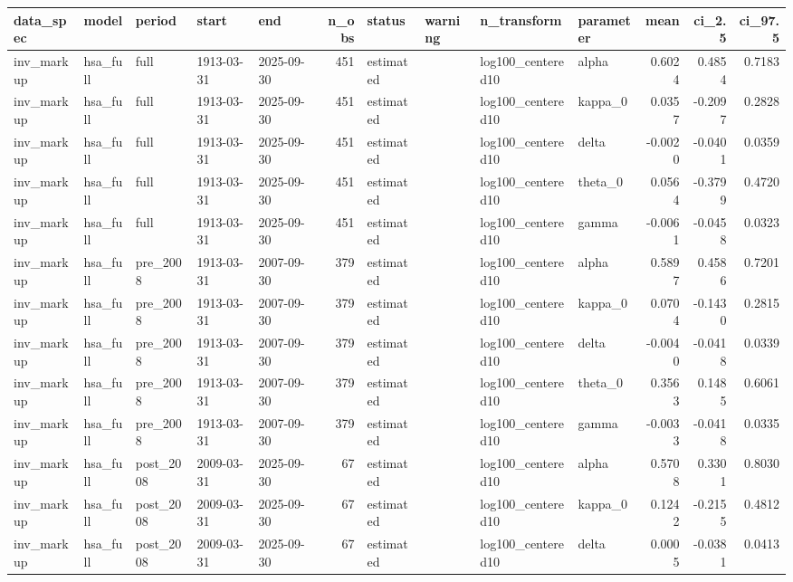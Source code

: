 \begin{tabular}{lllllrllllrrr}
\toprule
data\_spec & model & period & start & end & n\_obs & status & warning & n\_transform & parameter & mean & ci\_2.5 & ci\_97.5 \\
\midrule
inv\_markup & hsa\_full & full & 1913-03-31 & 2025-09-30 & 451 & estimated &  & log100\_centered10 & alpha & 0.6024 & 0.4854 & 0.7183 \\
inv\_markup & hsa\_full & full & 1913-03-31 & 2025-09-30 & 451 & estimated &  & log100\_centered10 & kappa\_0 & 0.0357 & -0.2097 & 0.2828 \\
inv\_markup & hsa\_full & full & 1913-03-31 & 2025-09-30 & 451 & estimated &  & log100\_centered10 & delta & -0.0020 & -0.0401 & 0.0359 \\
inv\_markup & hsa\_full & full & 1913-03-31 & 2025-09-30 & 451 & estimated &  & log100\_centered10 & theta\_0 & 0.0564 & -0.3799 & 0.4720 \\
inv\_markup & hsa\_full & full & 1913-03-31 & 2025-09-30 & 451 & estimated &  & log100\_centered10 & gamma & -0.0061 & -0.0458 & 0.0323 \\
inv\_markup & hsa\_full & pre\_2008 & 1913-03-31 & 2007-09-30 & 379 & estimated &  & log100\_centered10 & alpha & 0.5897 & 0.4586 & 0.7201 \\
inv\_markup & hsa\_full & pre\_2008 & 1913-03-31 & 2007-09-30 & 379 & estimated &  & log100\_centered10 & kappa\_0 & 0.0704 & -0.1430 & 0.2815 \\
inv\_markup & hsa\_full & pre\_2008 & 1913-03-31 & 2007-09-30 & 379 & estimated &  & log100\_centered10 & delta & -0.0040 & -0.0418 & 0.0339 \\
inv\_markup & hsa\_full & pre\_2008 & 1913-03-31 & 2007-09-30 & 379 & estimated &  & log100\_centered10 & theta\_0 & 0.3563 & 0.1485 & 0.6061 \\
inv\_markup & hsa\_full & pre\_2008 & 1913-03-31 & 2007-09-30 & 379 & estimated &  & log100\_centered10 & gamma & -0.0033 & -0.0418 & 0.0335 \\
inv\_markup & hsa\_full & post\_2008 & 2009-03-31 & 2025-09-30 & 67 & estimated &  & log100\_centered10 & alpha & 0.5708 & 0.3301 & 0.8030 \\
inv\_markup & hsa\_full & post\_2008 & 2009-03-31 & 2025-09-30 & 67 & estimated &  & log100\_centered10 & kappa\_0 & 0.1242 & -0.2155 & 0.4812 \\
inv\_markup & hsa\_full & post\_2008 & 2009-03-31 & 2025-09-30 & 67 & estimated &  & log100\_centered10 & delta & 0.0005 & -0.0381 & 0.0413 \\

\end{tabular}
